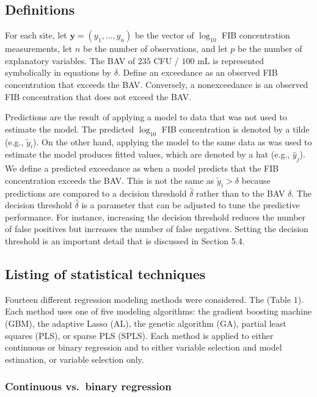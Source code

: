\documentclass[authoryear,review, 12pt]{elsarticle}
\begin{document}
\subsection{Definitions}\label{definitions}

For each site, let \(\bm{y}=(y_1, \dots, y_n)\) be the vector of
\(\log_{10}\) FIB concentration measurements, let \(n\) be the number of
observations, and let \(p\) be the number of explanatory variables. The
BAV of \(235\) CFU / \(100\) mL is represented
symbolically in equations by \(\delta\). Define an exceedance as an observed FIB concentration that exceeds the BAV. Conversely, a
nonexceedance is an observed FIB concentration that does not exceed the
BAV.

Predictions are the result of applying a model to data that was not used
to estimate the model. The predicted \(\log_{10}\) FIB concentration is
denoted by a tilde (e.g., \(\tilde{y}_i\)). On the other hand, applying
the model to the same data as was used to estimate the model produces
fitted values, which are denoted by a hat (e.g., \(\hat{y}_j\)). We
define a predicted exceedance as when a model predicts that the FIB
concentration exceeds the BAV. This is not the same as
\(\tilde{y}_i > \delta\) because predictions are compared to a decision
threshold \(\hat{\delta}\) rather than to the BAV \(\delta\). The
decision threshold \(\hat{\delta}\) is a parameter that can be adjusted
to tune the predictive performance. For instance, increasing the
decision threshold reduces the number of false positives but increases
the number of false negatives. Setting the decision threshold is an
important detail that is discussed in Section 5.4.

\subsection{Listing of statistical
techniques}\label{listing-of-statistical-techniques}

Fourteen different regression modeling methods were considered. The  (Table
1). Each method uses one of five modeling algorithms: the gradient
boosting machine (GBM), the adaptive Lasso (AL), the genetic algorithm
(GA), partial least squares (PLS), or sparse PLS (SPLS). Each method
is applied to either continuous or binary regression and to either
variable selection and model estimation, or variable selection only.

\subsubsection{Continuous vs.~binary
regression}\label{continuous-vs.binary-regression}
\end{document}
